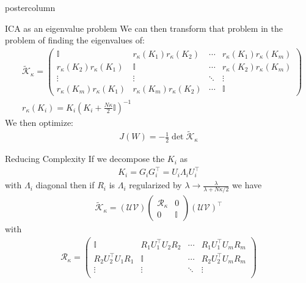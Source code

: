 \documentclass{beamer}
\begin{document}
\begin{frame}
\begin{columns}
\begin{column}{.5\textwidth}
\begin{beamercolorbox}[center]{postercolumn}
\begin{minipage}{.98\textwidth}
{\begin{myblock}{ICA as an eigenvalue problem}
						We can then transform that problem in the problem of finding the eigenvalues of:
						\begin{align*}
							&\tilde{\mathcal{K}}_\kappa = \begin{pmatrix}
								\mathbb{I} & r_\kappa (K_1)  r_\kappa (K_2)  & \cdots &  r_\kappa (K_1) r_\kappa (K_m)\\
								r_\kappa (K_2)  r_\kappa (K_1) & \mathbb{I} & \cdots & r_\kappa (K_2) r_\kappa (K_m) \\
								\vdots & \vdots & \ddots & \vdots \\
								r_\kappa (K_m)  r_\kappa (K_1) & r_\kappa (K_m) r_\kappa (K_2) & \cdots & \mathbb{I}
							\end{pmatrix} \\
							& r_\kappa (K_i) = K_i (K_i + \frac{N \kappa}{2} \mathbb{I})^{-1}
						\end{align*}
						We then optimize:
						\begin{align*}
							J(W) = -\frac{1}{2} \det \tilde{\mathcal{K}}_\kappa
						\end{align*}
					\end{myblock}\vfill
					\begin{myblock}{Reducing Complexity}
						If we decompose the $K_i$ as
						\begin{align*}
							K_i = G_i G_i^\intercal = U_i \Lambda_i U_i^\intercal
						\end{align*}
						with $\Lambda_i$ diagonal then if $R_i$ is $\Lambda_i$ regularized by $\lambda \to \frac{\lambda}{\lambda + N \kappa / 2}$ we have
						\begin{align*}
							\tilde{\mathcal{K}}_\kappa = (\mathcal{U} \mathcal{V}) \begin{pmatrix}
							\mathcal{R}_\kappa & 0 \\
							0 & \mathbb{I}
							\end{pmatrix} (\mathcal{U} \mathcal{V})^\intercal
						\end{align*}
						with
						\begin{align*}
							\mathcal{R}_\kappa =  \begin{pmatrix}
								\mathbb{I} & R_1 U_1^\intercal U_2 R_2  & \cdots &  R_1 U_1^\intercal U_m R_m \\
								 R_2 U_2^\intercal U_1 R_1 & \mathbb{I} & \cdots & R_2 U_2^\intercal U_m R_m \\
								\vdots & \vdots & \ddots & \vdots \\

\end{pmatrix}
\end{align*}
\end{myblock}}
\end{minipage}
\end{beamercolorbox}
\end{column}
\end{columns}
\end{frame}
\end{document}
